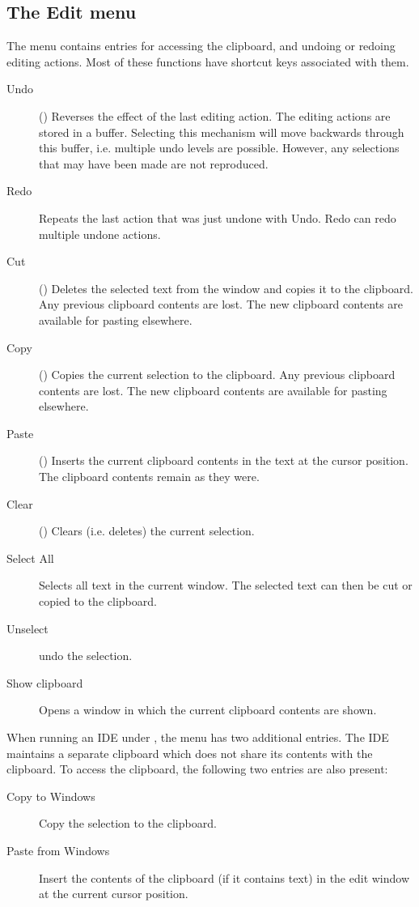 \subsection{The Edit menu}
\label{se:menuedit}
The  menu contains entries for accessing the clipboard, and
undoing or redoing editing actions. Most of these functions have shortcut
keys associated with them.
\begin{description}
\item[Undo] () Reverses the effect of the last editing action.
The editing actions are stored in a buffer.
Selecting this mechanism will move backwards through this buffer, i.e.
multiple undo levels are possible. 
However, any selections that may have been made are not reproduced.
\item[Redo] Repeats the last action that was just undone with Undo.
Redo can redo multiple undone actions.
\item[Cut] () Deletes the selected text from the window and
copies it to the clipboard. Any previous clipboard contents are lost. 
The new clipboard contents are available for pasting elsewhere.
\item[Copy] () Copies the current selection to the clipboard.
Any previous clipboard contents are lost. The new clipboard
contents are available for pasting elsewhere.
\item[Paste] () Inserts the current clipboard contents in the
text at the cursor position. The clipboard contents remain as they were.  
\item[Clear] () Clears (i.e. deletes) the current
selection.
\item[Select All] Selects all text in the current window. The selected
text can then be cut or copied to the clipboard.
\item[Unselect] undo the selection.
\item[Show clipboard] Opens a window in which the current clipboard contents
are shown.
\end{description}
When running an IDE under \windows, the  menu has two
additional entries. The IDE maintains a separate clipboard which does
not share its contents with the \windows clipboard. To access the \windows
clipboard, the following two entries are also present:
\begin{description}
\item[Copy to Windows] Copy the selection to the \windows clipboard.
\item[Paste from Windows] Insert the contents of the \windows clipboard 
(if it contains text) in the edit window at the current cursor position.
\end{description}

